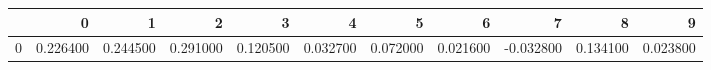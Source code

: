 \begin{tabular}{lrrrrrrrrrr}
\toprule
 & 0 & 1 & 2 & 3 & 4 & 5 & 6 & 7 & 8 & 9 \\
\midrule
0 & 0.226400 & 0.244500 & 0.291000 & 0.120500 & 0.032700 & 0.072000 & 0.021600 & -0.032800 & 0.134100 & 0.023800 \\
\bottomrule
\end{tabular}
